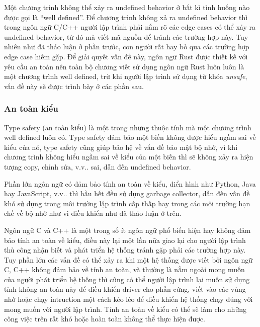 Một chương trình không thể xảy ra undefined behavior ở bất kì tình huống nào được gọi là ``well defined''.
Để chương trình không xả ra undefined behavior thì trong ngôn ngữ C/C++ người lập trình phải nắm rõ các edge cases có thể xảy ra undefined behavior, từ đó mà viết mã nguồn để tránh các trường hợp này.
Tuy nhiên như đã thảo luận ở phần trước, con người rất hay bỏ qua các trường hợp edge case hiếm gặp.
Để giải quyết vấn đề này, ngôn ngữ Rust được thiết kế với yêu cầu an toàn nên toàn bộ chương viết sử dụng ngôn ngữ Rust luôn luôn là một chương trình well defined, trừ khi người lập trình sử dụng từ khóa \emph{unsafe}, vấn đề này sẽ được trình bày ở các phần sau.

%

\subsubsection{An toàn kiểu}
Type safety (an toàn kiểu) là một trong những thuộc tính mà một chương trình well defined luôn có.
Type safety đảm bảo một biến không được hiểu ngầm sai về kiểu của nó, type safety cũng giúp bảo hệ về vấn đề bảo mật bộ nhớ, vì khi chương trình không hiểu ngầm sai về kiểu của một biến thì sẽ không xảy ra hiện tượng copy, chỉnh sửa, v.v.. sai, dẫn đến undefined behavior.

Phần lớn ngôn ngữ có đảm bảo tính an toàn về kiểu, điển hình như Python, Java hay JavaScript, v.v.. thì hầu hết đều sử dụng garbage collector, dẫn đến vấn đề khó sử dụng trong môi trường lập trình cấp thấp hay trong các môi trường hạn chế về bộ nhớ như vi điều khiển như đã thảo luận ở trên.

Ngôn ngữ C và C++ là một trong số ít ngôn ngữ phổ biến hiện hay không đảm bảo tính an toàn về kiểu, điều này lại một lần nữa giao lại cho người lập trình thủ công nhận biết và phát triển hệ thống tránh gặp phải các trường hợp này.
Tuy phần lớn các vấn đề có thể xảy ra khi một hệ thống được viết bởi ngôn ngữ C, C++ không đảm bảo về tính an toàn, và thường là nằm ngoài mong muốn của người phát triển hệ thống thì cũng có thể người lập trình lại muốn sử dụng tính không an toàn này để điều khiển driver cho phần cứng, viết vào các vùng nhớ hoặc chạy intruction một cách kéo léo để điều khiển hệ thống chạy đúng với mong muốn với người lập trình.
Tính an toàn về kiểu có thể sẽ làm cho những công việc trên rất khó hoặc hoàn toàn không thể thực hiện được.

